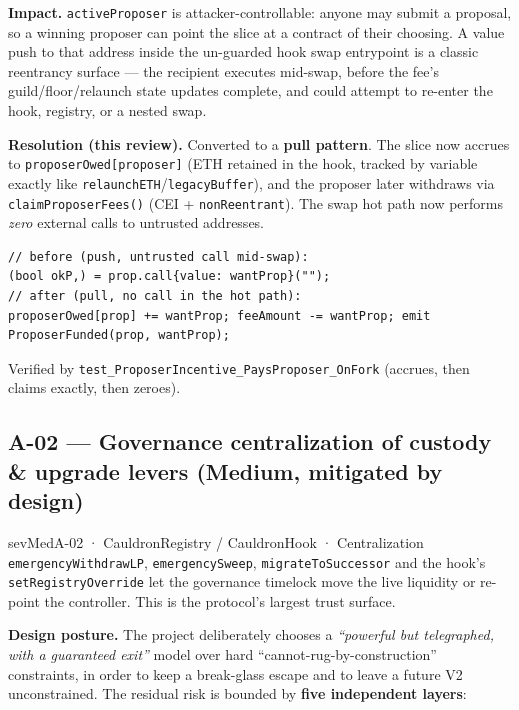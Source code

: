 \documentclass[11pt]{article}
\newcommand{\sev}[2]{\textcolor{#1}{\textbf{#2}}}
\begin{document}
\noindent\textbf{Impact.} \texttt{activeProposer} is attacker-controllable: anyone may
submit a proposal, so a winning proposer can point the slice at a contract of their
choosing. A value push to that address inside the un-guarded hook swap entrypoint is a
classic reentrancy surface — the recipient executes mid-swap, before the fee's
guild/floor/relaunch state updates complete, and could attempt to re-enter the hook,
registry, or a nested swap.

\noindent\textbf{Resolution (this review).} Converted to a \textbf{pull pattern}. The
slice now accrues to \texttt{proposerOwed[proposer]} (ETH retained in the hook, tracked by
variable exactly like \texttt{relaunchETH}/\texttt{legacyBuffer}), and the proposer later
withdraws via \texttt{claimProposerFees()} (CEI + \texttt{nonReentrant}). The swap hot
path now performs \emph{zero} external calls to untrusted addresses.

\begin{lstlisting}
// before (push, untrusted call mid-swap):
(bool okP,) = prop.call{value: wantProp}("");
// after (pull, no call in the hot path):
proposerOwed[prop] += wantProp; feeAmount -= wantProp; emit ProposerFunded(prop, wantProp);
\end{lstlisting}

\noindent Verified by \texttt{test\_ProposerIncentive\_PaysProposer\_OnFork} (accrues,
then claims exactly, then zeroes).

\subsection{A-02 --- Governance centralization of custody \& upgrade levers \sev{sevMed}{(Medium, mitigated by design)}}
\label{sec:trust}
\begin{finding}{sevMed}{A-02 · CauldronRegistry / CauldronHook · Centralization}
\texttt{emergencyWithdrawLP}, \texttt{emergencySweep}, \texttt{migrateToSuccessor} and the
hook's \texttt{setRegistryOverride} let the governance timelock move the live liquidity or
re-point the controller. This is the protocol's largest trust surface.
\end{finding}

\noindent\textbf{Design posture.} The project deliberately chooses a \emph{``powerful but
telegraphed, with a guaranteed exit''} model over hard ``cannot-rug-by-construction''
constraints, in order to keep a break-glass escape and to leave a future V2 unconstrained.
The residual risk is bounded by \textbf{five independent layers}:
\end{document}
